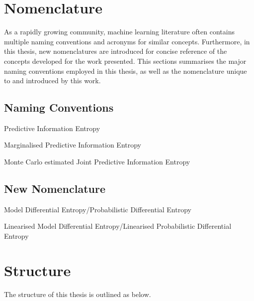 	\newpage
	\section{Nomenclature}
	
		As a rapidly growing community, machine learning literature often contains multiple naming conventions and acronyms for similar concepts. Furthermore, in this thesis, new nomenclatures are introduced for concise reference of the concepts developed for the work presented. This sections summarises the major naming conventions employed in this thesis, as well as the nomenclature  unique to and introduced by this work.
		
		\subsection{Naming Conventions}
		
			Predictive Information Entropy
			
			Marginalised Predictive Information Entropy
			
			Monte Carlo estimated Joint Predictive Information Entropy
			
		\subsection{New Nomenclature}
		
			Model Differential Entropy/Probabilistic Differential Entropy
			
			Linearised Model Differential Entropy/Linearised Probabilistic Differential Entropy
			
	\newpage
	\section{Structure}
	
		The structure of this thesis is outlined as below.
		
		
